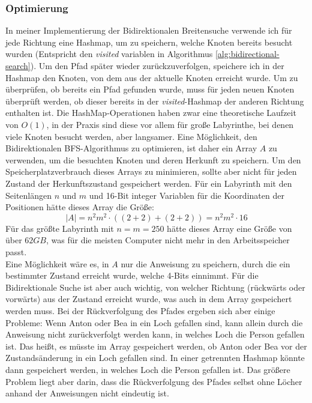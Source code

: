 \documentclass[a4paper,10pt,ngerman]{scrartcl}
\begin{document}
    \subsubsection{Optimierung}
    In meiner Implementierung der Bidirektionalen Breitensuche verwende ich für jede Richtung eine Hashmap, um zu speichern, welche Knoten bereits besucht wurden (Entspricht den \textit{visited} variablen in Algorithmus \ref{alg:bidirectional-search}).
    Um den Pfad später wieder zurückzuverfolgen, speichere ich in der Hashmap den Knoten, von dem aus der aktuelle Knoten erreicht wurde.
    Um zu überprüfen, ob bereits ein Pfad gefunden wurde, muss für jeden neuen Knoten überprüft werden, ob dieser bereits in der \textit{visited}-Hashmap der anderen Richtung enthalten ist.
    Die HashMap-Operationen haben zwar eine theoretische Laufzeit von $O(1)$, in der Praxis sind diese vor allem für große Labyrinthe, bei denen viele Knoten besucht werden, aber langsamer.
    Eine Möglichkeit, den Bidirektionalen BFS-Algorithmus zu optimieren, ist daher ein Array $A$ zu verwenden, um die besuchten Knoten und deren Herkunft zu speichern.
    Um den Speicherplatzverbrauch dieses Arrays zu minimieren, sollte aber nicht für jeden Zustand der Herkunftszustand gespeichert werden.
    Für ein Labyrinth mit den Seitenlängen $n$ und $m$ und 16-Bit integer Variablen für die Koordinaten der Positionen hätte dieses Array die Größe:
    \[
        |A| = n^2 m^2 \cdot ((2 + 2) + (2 + 2)) = n^2 m^2 \cdot 16
    \]
    Für das größte Labyrinth mit $n = m = 250$ hätte dieses Array eine Größe von über $62GB$, was für die meisten Computer nicht mehr in den Arbeitsspeicher passt. \\
    Eine Möglichkeit wäre es, in $A$ nur die Anweisung zu speichern, durch die ein bestimmter Zustand erreicht wurde, welche 4-Bits einnimmt.
    Für die Bidirektionale Suche ist aber auch wichtig, von welcher Richtung (rückwärts oder vorwärts) aus der Zustand erreicht wurde, was auch in dem Array gespeichert werden muss.
    Bei der Rückverfolgung des Pfades ergeben sich aber einige Probleme:
    Wenn Anton oder Bea in ein Loch gefallen sind, kann allein durch die Anweisung nicht zurückverfolgt werden kann, in welches Loch die Person gefallen ist.
    Das heißt, es müsste im Array gespeichert werden, ob Anton oder Bea vor der Zustandsänderung in ein Loch gefallen sind.
    In einer getrennten Hashmap könnte dann gespeichert werden, in welches Loch die Person gefallen ist.
    Das größere Problem liegt aber darin, dass die Rückverfolgung des Pfades selbst ohne Löcher anhand der Anweisungen nicht eindeutig ist.
\end{document}
